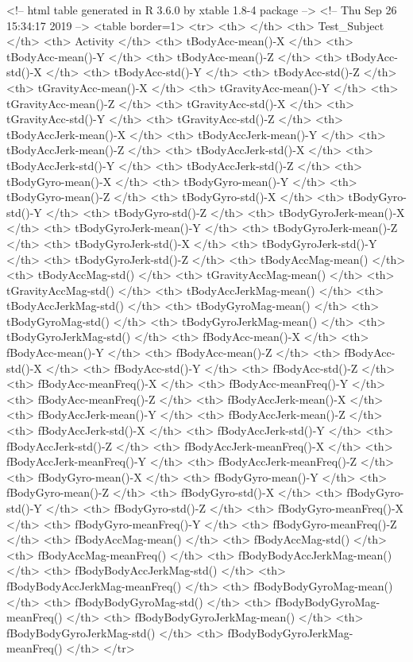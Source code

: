 <!-- html table generated in R 3.6.0 by xtable 1.8-4 package -->
<!-- Thu Sep 26 15:34:17 2019 -->
<table border=1>
<tr> <th>  </th> <th> Test_Subject </th> <th> Activity </th> <th> tBodyAcc-mean()-X </th> <th> tBodyAcc-mean()-Y </th> <th> tBodyAcc-mean()-Z </th> <th> tBodyAcc-std()-X </th> <th> tBodyAcc-std()-Y </th> <th> tBodyAcc-std()-Z </th> <th> tGravityAcc-mean()-X </th> <th> tGravityAcc-mean()-Y </th> <th> tGravityAcc-mean()-Z </th> <th> tGravityAcc-std()-X </th> <th> tGravityAcc-std()-Y </th> <th> tGravityAcc-std()-Z </th> <th> tBodyAccJerk-mean()-X </th> <th> tBodyAccJerk-mean()-Y </th> <th> tBodyAccJerk-mean()-Z </th> <th> tBodyAccJerk-std()-X </th> <th> tBodyAccJerk-std()-Y </th> <th> tBodyAccJerk-std()-Z </th> <th> tBodyGyro-mean()-X </th> <th> tBodyGyro-mean()-Y </th> <th> tBodyGyro-mean()-Z </th> <th> tBodyGyro-std()-X </th> <th> tBodyGyro-std()-Y </th> <th> tBodyGyro-std()-Z </th> <th> tBodyGyroJerk-mean()-X </th> <th> tBodyGyroJerk-mean()-Y </th> <th> tBodyGyroJerk-mean()-Z </th> <th> tBodyGyroJerk-std()-X </th> <th> tBodyGyroJerk-std()-Y </th> <th> tBodyGyroJerk-std()-Z </th> <th> tBodyAccMag-mean() </th> <th> tBodyAccMag-std() </th> <th> tGravityAccMag-mean() </th> <th> tGravityAccMag-std() </th> <th> tBodyAccJerkMag-mean() </th> <th> tBodyAccJerkMag-std() </th> <th> tBodyGyroMag-mean() </th> <th> tBodyGyroMag-std() </th> <th> tBodyGyroJerkMag-mean() </th> <th> tBodyGyroJerkMag-std() </th> <th> fBodyAcc-mean()-X </th> <th> fBodyAcc-mean()-Y </th> <th> fBodyAcc-mean()-Z </th> <th> fBodyAcc-std()-X </th> <th> fBodyAcc-std()-Y </th> <th> fBodyAcc-std()-Z </th> <th> fBodyAcc-meanFreq()-X </th> <th> fBodyAcc-meanFreq()-Y </th> <th> fBodyAcc-meanFreq()-Z </th> <th> fBodyAccJerk-mean()-X </th> <th> fBodyAccJerk-mean()-Y </th> <th> fBodyAccJerk-mean()-Z </th> <th> fBodyAccJerk-std()-X </th> <th> fBodyAccJerk-std()-Y </th> <th> fBodyAccJerk-std()-Z </th> <th> fBodyAccJerk-meanFreq()-X </th> <th> fBodyAccJerk-meanFreq()-Y </th> <th> fBodyAccJerk-meanFreq()-Z </th> <th> fBodyGyro-mean()-X </th> <th> fBodyGyro-mean()-Y </th> <th> fBodyGyro-mean()-Z </th> <th> fBodyGyro-std()-X </th> <th> fBodyGyro-std()-Y </th> <th> fBodyGyro-std()-Z </th> <th> fBodyGyro-meanFreq()-X </th> <th> fBodyGyro-meanFreq()-Y </th> <th> fBodyGyro-meanFreq()-Z </th> <th> fBodyAccMag-mean() </th> <th> fBodyAccMag-std() </th> <th> fBodyAccMag-meanFreq() </th> <th> fBodyBodyAccJerkMag-mean() </th> <th> fBodyBodyAccJerkMag-std() </th> <th> fBodyBodyAccJerkMag-meanFreq() </th> <th> fBodyBodyGyroMag-mean() </th> <th> fBodyBodyGyroMag-std() </th> <th> fBodyBodyGyroMag-meanFreq() </th> <th> fBodyBodyGyroJerkMag-mean() </th> <th> fBodyBodyGyroJerkMag-std() </th> <th> fBodyBodyGyroJerkMag-meanFreq() </th>  </tr>
